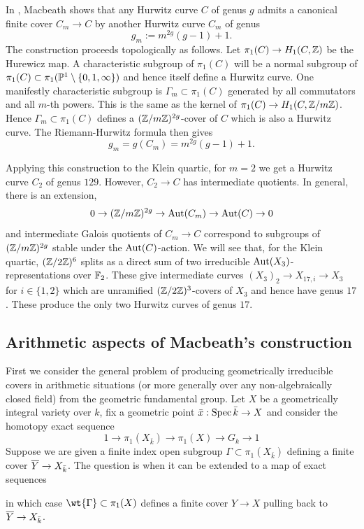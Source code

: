 \documentclass[main.tex]{subfiles}
\begin{document}
In \cite{macbeath:hurwitz_theorem}, Macbeath shows that any Hurwitz curve $C$ of genus $g$ admits a canonical finite \etale cover $C_m \to C$ by another Hurwitz curve $C_m$ of genus
\[ g_m := m^{2g} (g-1) + 1. \]
The construction proceeds topologically as follows. Let $\pi_1(C) \to H_1(C, \mathbb{Z})$ be the Hurewicz map. A characteristic subgroup of $\pi_1(C)$ will be a normal subgroup of $\pi_1(C) \subset \pi_1(\mathbb{P}^1 \setminus \{ 0, 1, \infty \})$ and hence itself define a Hurwitz curve. One manifestly characteristic subgroup is $\Gamma_m \subset \pi_1(C)$ generated by all commutators and all $m$-th powers. This is the same as the kernel of $\pi_1(C) \to H_1(C, \mathbb{Z} / m \mathbb{Z})$. Hence $\Gamma_m \subset \pi_1(C)$ defines a $(\mathbb{Z} / m \mathbb{Z})^{2g}$-cover of $C$ which is also a Hurwitz curve. The Riemann-Hurwitz formula then gives
\[ g_m = g(C_m) = m^{2g}(g-1) + 1. \]

Applying this construction to the Klein quartic, for $m = 2$ we get a Hurwitz curve $C_2$ of genus $129$. However, $C_2 \to C$ has intermediate quotients. In general, there is an extension,
\[ 0 \to (\mathbb{Z} / m \mathbb{Z})^{2g} \to \operatorname{\mathrm{Aut}}(C_m) \to \operatorname{\mathrm{Aut}}(C) \to 0 \]
and intermediate Galois quotients of $C_m \to C$ correspond to subgroups of $(\mathbb{Z} / m \mathbb{Z})^{2g}$ stable under the $\operatorname{\mathrm{Aut}}(C)$-action.
We will see that, for the Klein quartic, $(\mathbb{Z} / 2 \mathbb{Z})^{6}$ splits as a direct sum of two irreducible $\operatorname{\mathrm{Aut}}(X_3)$-representations over $\mathbb{F}_2$. These give intermediate curves $(X_3)_2 \to X_{17,i} \to X_3$ for $i \in \{ 1,2 \}$ which are unramified $(\mathbb{Z}/2\mathbb{Z})^3$-covers of $X_3$ and hence have genus $17$. These produce the only two Hurwitz curves of genus $17$.

\subsection{Arithmetic aspects of Macbeath's construction}

First we consider the general problem of producing geometrically irreducible \etale covers in arithmetic situations (or more generally over any non-algebraically closed field) from the geometric fundamental group. Let $X$ be a geometrically integral variety over $k$, fix a geometric point $\bar{x} : \operatorname{\mathrm{Spec}}{\bar{k}} \to X$ and consider the homotopy exact sequence
\[ 1 \to \pi_1(X_{\bar{k}}) \to \pi_1(X) \to G_k \to 1 \]
Suppose we are given a finite index open subgroup $\Gamma \subset \pi_1(X_{\bar{k}})$ defining a finite \etale cover $\overline{Y} \to X_{\bar{k}}$. The question is when it can be extended to a map of exact sequences
\begin{center}
\end{center}
in which case $\wt{\Gamma} \subset \pi_1(X)$ defines a finite \etale cover $Y \to X$ pulling back to $\overline{Y} \to X_{\bar{k}}$. 
\end{document}
